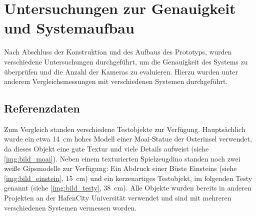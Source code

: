 \documentclass[./00PhotoBox.tex]{subfiles}
\begin{document}
\chapter{Untersuchungen zur Genauigkeit und Systemaufbau}
\label{c:versuche}
Nach Abschluss der Konstruktion und des Aufbaus des Prototyps, wurden verschiedene Untersuchungen durchgeführt, um die Genauigkeit des Systems zu überprüfen und die Anzahl der Kameras zu evaluieren. Hierzu wurden unter anderem Vergleichsmessungen mit verschiedenen Systemen durchgeführt.

\section{Referenzdaten}
\label{s:referenzdaten}
Zum Vergleich standen verschiedene Testobjekte zur Verfügung. Hauptsächlich wurde ein etwa \SI{14}{\centi\metre} hohes Modell einer Moai-Statue der Osterinsel verwendet, da dieses Objekt eine gute Textur und viele Details aufweist (siehe \autoref{img:bild_moai}). Neben einem texturierten Spielzeugdino standen noch zwei weiße Gipsmodelle zur Verfügung: Ein Abdruck einer Büste Einsteins (siehe \autoref{img:bild_einstein}, \SI{15}{\centi\metre}) und ein kerzenartiges Testobjekt, im folgenden Testy genannt (siehe \autoref{img:bild_testy}, \SI{38}{\centi\metre}). Alle Objekte wurden bereits in anderen Projekten an der HafenCity Universität verwendet \citep[vgl. z.\,B.][]{kersten_scanner} und sind mit mehreren verschiedenen Systemen vermessen worden.
\end{document}

